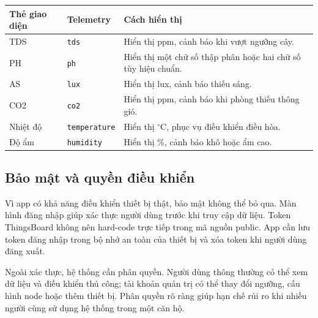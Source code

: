 \begin{longtable}{|p{3.2cm}|p{3.5cm}|p{6cm}|}
\hline
\textbf{Thẻ giao diện} & \textbf{Telemetry} & \textbf{Cách hiển thị} \\
\hline
TDS & \texttt{tds} & Hiển thị ppm, cảnh báo khi vượt ngưỡng cây. \\
\hline
PH & \texttt{ph} & Hiển thị một chữ số thập phân hoặc hai chữ số tùy hiệu chuẩn. \\
\hline
AS & \texttt{lux} & Hiển thị lux, cảnh báo thiếu sáng. \\
\hline
CO2 & \texttt{co2} & Hiển thị ppm, cảnh báo khi phòng thiếu thông gió. \\
\hline
Nhiệt độ & \texttt{temperature} & Hiển thị $^\circ$C, phục vụ điều khiển điều hòa. \\
\hline
Độ ẩm & \texttt{humidity} & Hiển thị \%, cảnh báo khô hoặc ẩm cao. \\
\hline
\end{longtable}

\subsection{Bảo mật và quyền điều khiển}
Vì app có khả năng điều khiển thiết bị thật, bảo mật không thể bỏ qua. Màn hình đăng nhập giúp xác thực người dùng trước khi truy cập dữ liệu. Token ThingsBoard không nên hard-code trực tiếp trong mã nguồn public. App cần lưu token đăng nhập trong bộ nhớ an toàn của thiết bị và xóa token khi người dùng đăng xuất.

Ngoài xác thực, hệ thống cần phân quyền. Người dùng thông thường có thể xem dữ liệu và điều khiển thủ công; tài khoản quản trị có thể thay đổi ngưỡng, cấu hình node hoặc thêm thiết bị. Phân quyền rõ ràng giúp hạn chế rủi ro khi nhiều người cùng sử dụng hệ thống trong một căn hộ.
